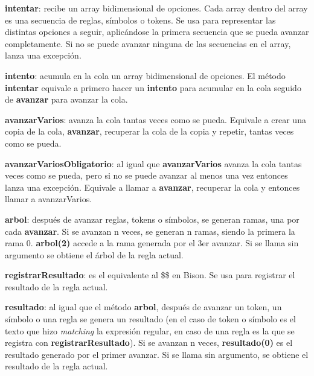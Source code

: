 \documentclass{report}
\begin{document}
	\vspace{10px}
	\noindent
	\textbf{intentar}: recibe un array bidimensional de opciones. Cada array dentro del array es una secuencia de reglas, símbolos o tokens. Se usa para representar las distintas opciones a seguir, aplicándose la primera secuencia que se pueda avanzar completamente. Si no se puede avanzar ninguna de las secuencias en el array, lanza una excepción. 
	
	\vspace{10px}
	\noindent
	\textbf{intento}: acumula en la cola un array bidimensional de opciones. El método \textbf{intentar} equivale a primero hacer un \textbf{intento} para acumular en la cola seguido de \textbf{avanzar} para avanzar la cola.
	
	\vspace{10px}
	\noindent
	\textbf{avanzarVarios}: avanza la cola tantas veces como se pueda. Equivale a crear una copia de la cola, \textbf{avanzar}, recuperar la cola de la copia y repetir, tantas veces como se pueda. 
	
	\vspace{10px}
	\noindent
	\textbf{avanzarVariosObligatorio}: al igual que \textbf{avanzarVarios} avanza la cola tantas veces como se pueda, pero si no se puede avanzar al menos una vez entonces lanza una excepción. Equivale a llamar a \textbf{avanzar}, recuperar la cola y entonces llamar a avanzarVarios.
	
	\vspace{10px}
	\textbf{arbol}: después de avanzar reglas, tokens o símbolos, se generan ramas, una por cada \textbf{avanzar}. Si se avanzan n veces, se generan n ramas, siendo la primera la rama 0. \textbf{arbol(2)} accede a la rama generada por el 3er avanzar. Si se llama sin argumento se obtiene el árbol de la regla actual.
	
	\vspace{10px}
	\textbf{registrarResultado}: es el equivalente al \$\$ en Bison. Se usa para registrar el resultado de la regla actual.
	
	\vspace{10px}
	\textbf{resultado}: al igual que el método \textbf{arbol}, después de avanzar un token, un símbolo o una regla se genera un resultado (en el caso de token o símbolo es el texto que hizo \textit{matching} la expresión regular, en caso de una regla es la que se registra con \textbf{registrarResultado}). Si se avanzan n veces, \textbf{resultado(0)} es el resultado generado por el primer avanzar. Si se llama sin argumento, se obtiene el resultado de la regla actual.
	
\end{document}
